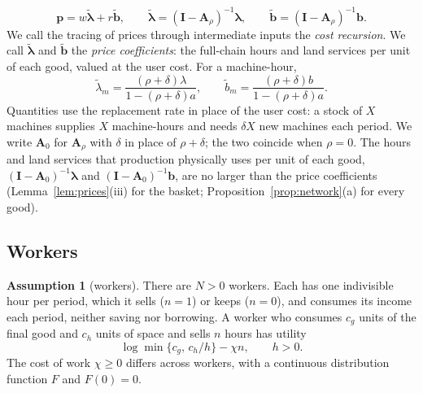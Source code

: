 \documentclass[12pt]{article}
\theoremstyle{plain}
\theoremstyle{definition}
\newtheorem{assumption}{Assumption}
\theoremstyle{remark}
\begin{document}
\begin{equation}\label{eq:4}
\mathbf p=w\widetilde{\bm\lambda}+r\widetilde{\mathbf b},\qquad
\widetilde{\bm\lambda}=(\mathbf I-\mathbf A_\rho)^{-1}\bm\lambda,\qquad
\widetilde{\mathbf b}=(\mathbf I-\mathbf A_\rho)^{-1}\mathbf b.
\end{equation}
We call the tracing of prices through intermediate inputs the \emph{cost recursion}.
We call $\widetilde{\bm\lambda}$ and $\widetilde{\mathbf b}$ the \emph{price coefficients}: the full-chain hours and land services per unit of each good, valued at the user cost. For a machine-hour,
\begin{equation}\label{eq:tildem}
\widetilde\lambda_m=\frac{(\rho+\delta)\lambda}{1-(\rho+\delta)a},\qquad
\widetilde b_m=\frac{(\rho+\delta)b}{1-(\rho+\delta)a}.
\end{equation}
Quantities use the replacement rate in place of the user cost: a stock of $X$ machines supplies $X$ machine-hours and needs $\delta X$ new machines each period. We write $\mathbf A_0$ for $\mathbf A_\rho$ with $\delta$ in place of $\rho+\delta$; the two coincide when $\rho=0$. The hours and land services that production physically uses per unit of each good, $(\mathbf I-\mathbf A_0)^{-1}\bm\lambda$ and $(\mathbf I-\mathbf A_0)^{-1}\mathbf b$, are no larger than the price coefficients (Lemma~\ref{lem:prices}(iii) for the basket; Proposition~\ref{prop:network}(a) for every good).

\subsection{Workers}\label{sec:workers}

\begin{assumption}[workers]\label{ass:workers}
There are $N>0$ workers. Each has one indivisible hour per period, which it sells ($n=1$) or keeps ($n=0$), and consumes its income each period, neither saving nor borrowing. A worker who consumes $c_g$ units of the final good and $c_h$ units of space and sells $n$ hours has utility
\begin{equation}\label{eq:utility}
\log\min\{c_g,\,c_h/h\}-\chi n,\qquad h>0.
\end{equation}
The cost of work $\chi\ge0$ differs across workers, with a continuous distribution function $F$ and $F(0)=0$.
\end{assumption}
\end{document}
